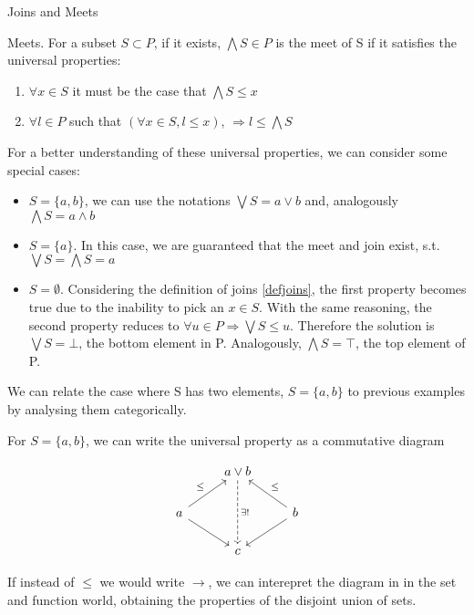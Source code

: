 \begin{section}{Joins and Meets}
\begin{definition}\label{defmeets}{Meets.}
    For a subset $S \subset P$, if it exists, $\bigwedge S \in P$ is the meet of S if 
    it satisfies the universal properties:
        \begin{enumerate} 
            \item $\forall x \in S$ it must be the case that $ \bigwedge S \leq x$
            \item $\forall l \in P$ such that $(\forall x \in S, l \leq x)$, $ \Rightarrow l \leq \bigwedge S$    
        \end{enumerate}
\end{definition}
For a better understanding of these universal properties, we can consider some 
special cases:
\begin{itemize}
    \item $S = \{a, b\}$, we can use the notations $\bigvee S = a \vee b$ 
        and, analogously $\bigwedge S = a \wedge b$
    \item $S = \{a\}$. In this case, we are guaranteed that the meet and 
        join exist, s.t. $\bigvee S = \bigwedge S = a$
    \item $S = \emptyset$. Considering the definition of joins \ref{defjoins},
        the first property becomes true due to the inability to pick an $x \in S$. With the same reasoning, the second property reduces to $\forall u \in P \Rightarrow \bigvee S \leq u$.
        Therefore the solution is $\bigvee S = \bot$, the bottom element in P.
        Analogously, $\bigwedge S = \top$, the top element of P.
\end{itemize} 

We can relate the case where S has two elements, $S = \{a, b\}$ to previous
examples by analysing them categorically.

For $S = \{a, b\}$, we can write the universal property as a commutative diagram 

\begin{align*}
    \begin{tikzcd}[ampersand replacement=\&]
        {} \& a \vee b \arrow[dd, dashed, "\exists ! "] \& {} \\
        a \arrow[ru, "\leq"] \arrow[rd, swap]
        \& {}
        \&
        b \arrow[lu, swap, "\leq"] \arrow[ld]
        \\
        {} \& c \& {}
    \end{tikzcd}
\end{align*}

If instead of $\leq$ we would write $\rightarrow$, we can interepret the diagram in
in the set and function world, obtaining the properties of the disjoint union of sets.


\end{section}
